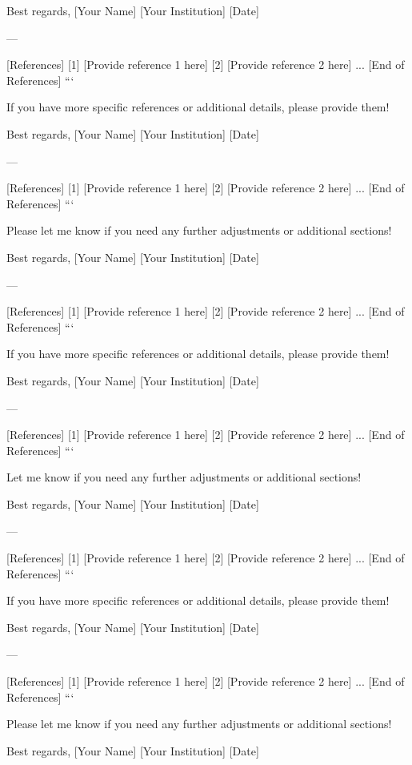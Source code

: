 Best regards,  
[Your Name]  
[Your Institution]  
[Date]  

--- 

[References]  
[1] [Provide reference 1 here]  
[2] [Provide reference 2 here]  
...  
[End of References]  
``` 

If you have more specific references or additional details, please provide them! 

Best regards,  
[Your Name]  
[Your Institution]  
[Date]  

--- 

[References]  
[1] [Provide reference 1 here]  
[2] [Provide reference 2 here]  
...  
[End of References]  
``` 

Please let me know if you need any further adjustments or additional sections! 

Best regards,  
[Your Name]  
[Your Institution]  
[Date]  

--- 

[References]  
[1] [Provide reference 1 here]  
[2] [Provide reference 2 here]  
...  
[End of References]  
``` 

If you have more specific references or additional details, please provide them! 

Best regards,  
[Your Name]  
[Your Institution]  
[Date]  

--- 

[References]  
[1] [Provide reference 1 here]  
[2] [Provide reference 2 here]  
...  
[End of References]  
``` 

Let me know if you need any further adjustments or additional sections! 

Best regards,  
[Your Name]  
[Your Institution]  
[Date]  

--- 

[References]  
[1] [Provide reference 1 here]  
[2] [Provide reference 2 here]  
...  
[End of References]  
``` 

If you have more specific references or additional details, please provide them! 

Best regards,  
[Your Name]  
[Your Institution]  
[Date]  

--- 

[References]  
[1] [Provide reference 1 here]  
[2] [Provide reference 2 here]  
...  
[End of References]  
``` 

Please let me know if you need any further adjustments or additional sections! 

Best regards,  
[Your Name]  
[Your Institution]  
[Date]  

